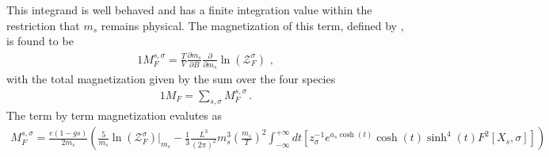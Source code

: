 This integrand is well behaved and has a finite integration value within the restriction that $m_{s}$ remains physical. The magnetization of this term, defined by , is found to be
\begin{alignat}{1}
    \label{FreelikeMag} M_{F}^{s,\sigma}=\frac{T}{V}\frac{\partial m_{s}}{\partial B}\frac{\partial}{\partial m_{s}}\ln(\mathcal{Z}_{F}^{\sigma})\,\,,
\end{alignat}
with the total magnetization given by the sum over the four species
\begin{alignat}{1}
    \label{TotalFreeMag} M_{F}=\sum_{s,\sigma}M_{F}^{s,\sigma}\,.
\end{alignat}
The term by term magnetization evalutes as
\begin{align}
  \label{MagExplicit} M_{F}^{s,\sigma} = \frac{e(1-gs)}{2m_{s}}\left(\frac{5}{m_{s}}\ln\left(\mathcal{Z}^{\sigma}_{F}\right)|_{m_{s}}-\frac{1}{3}\frac{L^{3}}{(2\pi)^{2}}m_{s}^{3}\left(\frac{m_{s}}{T}\right)^{2}\int_{-\infty}^{+\infty}dt\left[z_{\sigma}^{-1}e^{a_{s}\cosh(t)}\cosh(t)\sinh^{4}(t)F^{2}\left[X_{s},\sigma\right]\right]\right)
\end{align}